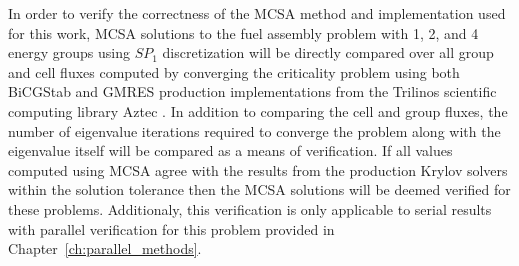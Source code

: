 In order to verify the correctness of the MCSA method and
implementation used for this work, MCSA solutions to the fuel assembly
problem with 1, 2, and 4 energy groups using $SP_1$ discretization
will be directly compared over all group and cell fluxes computed by
converging the criticality problem using both BiCGStab and GMRES
production implementations from the Trilinos scientific computing
library Aztec \citep{heroux_overview_2005}. In addition to comparing
the cell and group fluxes, the number of eigenvalue iterations
required to converge the problem along with the eigenvalue itself will
be compared as a means of verification. If all values computed using
MCSA agree with the results from the production Krylov solvers within
the solution tolerance then the MCSA solutions will be deemed verified
for these problems. Additionaly, this verification is only applicable
to serial results with parallel verification for this problem provided
in Chapter~\ref{ch:parallel_methods}.

